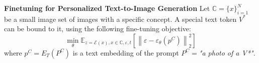 \textbf{Finetuning for Personalized Text-to-Image Generation} Let $\mathbb{C} = \{ x\}_{i=1}^N$ be a small image set of images with a specific concept. A special text token $V^*$ can be bound to it, using the following fine-tuning objective:
\begin{equation}\label{eq:finetuning}
\min_\theta \mathbb{E}_{z=\mathcal{E}(x), x \in \mathbb{C}, \varepsilon, t}\left[\left\|\varepsilon-\varepsilon_\theta(p^{C})\right\|_2^2\right]
\end{equation}
where $p^C = E_T(P^C)$ is a text embedding of the prompt $P^C = $\textit{"a photo of a V*"}.